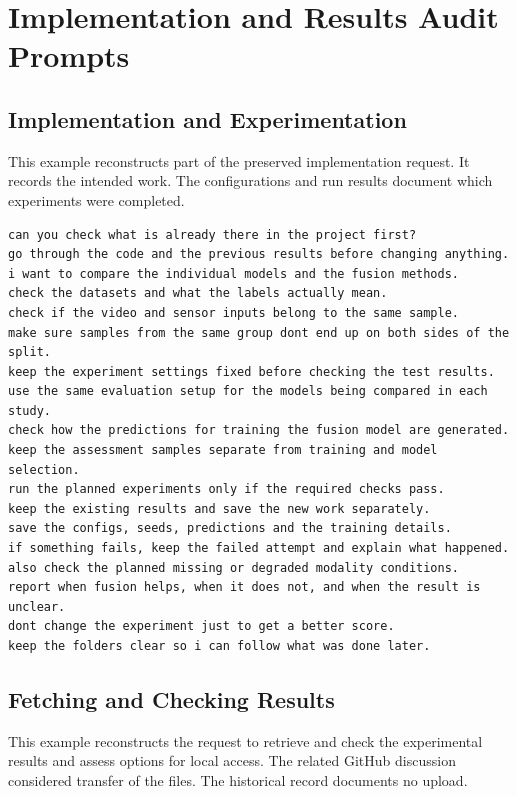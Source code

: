 \chapter{Implementation and Results Audit Prompts}
\label{app:prompt-record}

\section{Implementation and Experimentation}
This example reconstructs part of the preserved implementation request. It records the intended work. The configurations and run results document which experiments were completed.

\begingroup\singlespacing\footnotesize
\begin{verbatim}
can you check what is already there in the project first?
go through the code and the previous results before changing anything.
i want to compare the individual models and the fusion methods.
check the datasets and what the labels actually mean.
check if the video and sensor inputs belong to the same sample.
make sure samples from the same group dont end up on both sides of the split.
keep the experiment settings fixed before checking the test results.
use the same evaluation setup for the models being compared in each study.
check how the predictions for training the fusion model are generated.
keep the assessment samples separate from training and model selection.
run the planned experiments only if the required checks pass.
keep the existing results and save the new work separately.
save the configs, seeds, predictions and the training details.
if something fails, keep the failed attempt and explain what happened.
also check the planned missing or degraded modality conditions.
report when fusion helps, when it does not, and when the result is unclear.
dont change the experiment just to get a better score.
keep the folders clear so i can follow what was done later.
\end{verbatim}
\endgroup

\section{Fetching and Checking Results}
This example reconstructs the request to retrieve and check the experimental results and assess options for local access. The related GitHub discussion considered transfer of the files. The historical record documents no upload.

